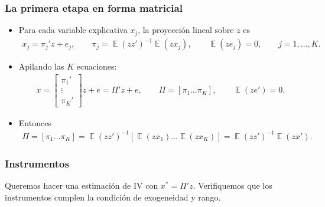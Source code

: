 \documentclass[t, compress, spanish, aspectratio=169]{beamer}
\DeclareMathOperator{\E}{\mathbb{E}}
\begin{document}
\begin{frame}
	\frametitle{La primera etapa en forma matricial}
	\small
	\begin{itemize}
		\item Para cada variable explicativa $x_j$, la proyecci\'on lineal sobre $z$ es
		\begin{align*}
		x_j=\pi_j'z+e_j,\qquad \pi_j=\E(zz')^{-1}\E(zx_j),\qquad \E(ze_j)=0, \qquad j=1,\dots,K.
		\end{align*}
		\item Apilando las $K$ ecuaciones:
		\begin{align*}
		x = \left[
		\begin{array}{c}
		\pi_1'\\
		\vdots\\
		\pi_K'
		\end{array}
		\right]z+e=\Pi'z+e, \qquad \Pi=[\pi_1 \ldots \pi_K],\qquad \E(ze')=0.
		\end{align*}
		\item Entonces
		\begin{align*}
		\Pi=[\pi_1 \ldots \pi_K]=\E(zz')^{-1} [\E(zx_1) \ldots \E(zx_K)]=\E(zz')^{-1} \E(zx').
		\end{align*}
	\end{itemize}
\end{frame}
\begin{frame}
    \frametitle{Instrumentos}
	Queremos hacer una estimaci\'on de IV con $x^*=\Pi'z$. Verifiquemos que los instrumentos cumplen la condici\'on de exogeneidad y rango.
\end{frame}

%
\end{document}

